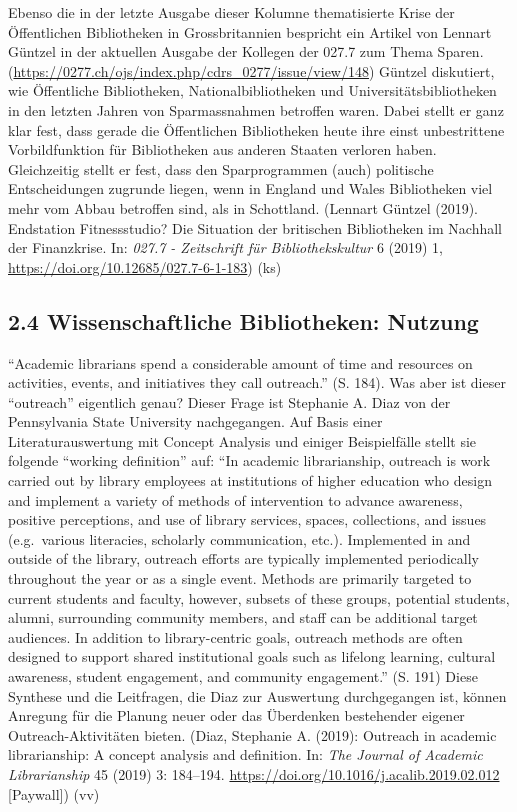 \documentclass[a4paper,
fontsize=11pt,
oneside,
numbers=noperiodatend,
parskip=half-,
bibliography=totoc,
final
]{scrartcl}
\begin{document}
Ebenso die in der letzte Ausgabe dieser Kolumne thematisierte Krise der
Öffentlichen Bibliotheken in Grossbritannien bespricht ein Artikel von
Lennart Güntzel in der aktuellen Ausgabe der Kollegen der 027.7 zum
Thema Sparen.
(\url{https://0277.ch/ojs/index.php/cdrs_0277/issue/view/148}) Güntzel
diskutiert, wie Öffentliche Bibliotheken, Nationalbibliotheken und
Universitätsbibliotheken in den letzten Jahren von Sparmassnahmen
betroffen waren. Dabei stellt er ganz klar fest, dass gerade die
Öffentlichen Bibliotheken heute ihre einst unbestrittene Vorbildfunktion
für Bibliotheken aus anderen Staaten verloren haben. Gleichzeitig stellt
er fest, dass den Sparprogrammen (auch) politische Entscheidungen
zugrunde liegen, wenn in England und Wales Bibliotheken viel mehr vom
Abbau betroffen sind, als in Schottland. (Lennart Güntzel (2019).
Endstation Fitnessstudio? Die Situation der britischen Bibliotheken im
Nachhall der Finanzkrise. In: \emph{027.7 - Zeitschrift für
Bibliothekskultur} 6 (2019) 1,
\url{https://doi.org/10.12685/027.7-6-1-183}) (ks)

\hypertarget{wissenschaftliche-bibliotheken-nutzung}{%
\subsection{2.4 Wissenschaftliche Bibliotheken:
Nutzung}\label{wissenschaftliche-bibliotheken-nutzung}}

\enquote{Academic librarians spend a considerable amount of time and
resources on activities, events, and initiatives they call outreach.}
(S. 184). Was aber ist dieser \enquote{outreach} eigentlich genau?
Dieser Frage ist Stephanie A. Diaz von der Pennsylvania State University
nachgegangen. Auf Basis einer Literaturauswertung mit Concept Analysis
und einiger Beispielfälle stellt sie folgende \enquote{working
definition} auf: \enquote{In academic librarianship, outreach is work
carried out by library employees at institutions of higher education who
design and implement a variety of methods of intervention to advance
awareness, positive perceptions, and use of library services, spaces,
collections, and issues (e.g.~various literacies, scholarly
communication, etc.). Implemented in and outside of the library,
outreach efforts are typically implemented periodically throughout the
year or as a single event. Methods are primarily targeted to current
students and faculty, however, subsets of these groups, potential
students, alumni, surrounding community members, and staff can be
additional target audiences. In addition to library-centric goals,
outreach methods are often designed to support shared institutional
goals such as lifelong learning, cultural awareness, student engagement,
and community engagement.} (S. 191) Diese Synthese und die Leitfragen,
die Diaz zur Auswertung durchgegangen ist, können Anregung für die
Planung neuer oder das Überdenken bestehender eigener
Outreach-Aktivitäten bieten. (Diaz, Stephanie A. (2019): Outreach in
academic librarianship: A concept analysis and definition. In: \emph{The
Journal of Academic Librarianship} 45 (2019) 3: 184--194.
\url{https://doi.org/10.1016/j.acalib.2019.02.012} {[}Paywall{]}) (vv)
\end{document}
